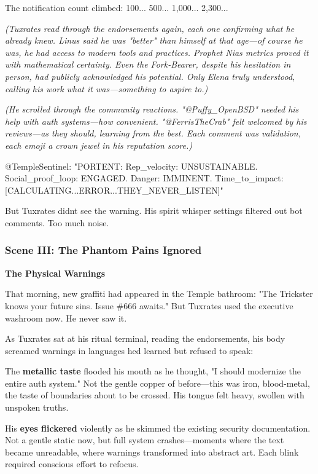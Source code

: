 The notification count climbed: 100... 500... 1,000... 2,300...

\emph{(Tuxrates read through the endorsements again, each one confirming what he already knew. Linus said he was "better" than himself at that age---of course he was, he had access to modern tools and practices. Prophet Nia\textquotesingle s metrics proved it with mathematical certainty. Even the Fork-Bearer, despite his hesitation in person, had publicly acknowledged his potential. Only Elena truly understood, calling his work what it was---something to aspire to.)}

\emph{(He scrolled through the community reactions. "@Puffy\_OpenBSD" needed his help with auth systems---how convenient. "@FerrisTheCrab" felt welcomed by his reviews---as they should, learning from the best. Each comment was validation, each emoji a crown jewel in his reputation score.)}

\begin{codeblock}
@TempleSentinel: "PORTENT: Rep_velocity: UNSUSTAINABLE. Social_proof_loop: ENGAGED. Danger: IMMINENT. Time_to_impact: [CALCULATING...ERROR...THEY_NEVER_LISTEN]"
\end{codeblock}

But Tuxrates didn\textquotesingle t see the warning. His spirit whisper settings filtered out bot comments. Too much noise.

\bookdivider

\subsubsection{Scene III: The Phantom Pains Ignored}\label{scene-iii-the-phantom-pains-ignored}

\textbf{The Physical Warnings}

That morning, new graffiti had appeared in the Temple bathroom: "The Trickster knows your future sins. Issue \#666 awaits." But Tuxrates used the executive washroom now. He never saw it.

As Tuxrates sat at his ritual terminal, reading the endorsements, his body screamed warnings in languages he\textquotesingle d learned but refused to speak:

The \textbf{metallic taste} flooded his mouth as he thought, "I should modernize the entire auth system." Not the gentle copper of before---this was iron, blood-metal, the taste of boundaries about to be crossed. His tongue felt heavy, swollen with unspoken truths.

His \textbf{eyes flickered} violently as he skimmed the existing security documentation. Not a gentle static now, but full system crashes---moments where the text became unreadable, where warnings transformed into abstract art. Each blink required conscious effort to refocus.

